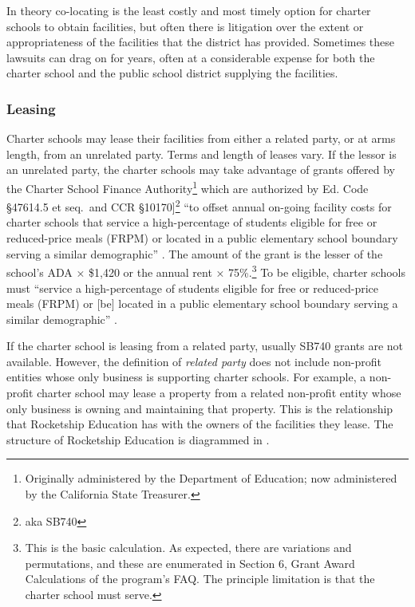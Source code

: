 In theory co-locating is the least costly and most timely option for charter schools to obtain facilities, but often there is litigation over the extent or appropriateness of the facilities that the district has provided. Sometimes these lawsuits can drag on for years, often at a considerable expense for both the charter school and the public school district supplying the facilities.

\subsubsection{Leasing}\label{sec:leasing}\indent

Charter schools may lease their facilities from either a related party, or at arms length, from an unrelated party. Terms and length of leases vary. If the lessor is an unrelated party, the charter schools may take advantage of grants offered by the Charter School Finance Authority\footnote{Originally administered by the Department of Education; now administered by the California State Treasurer.} which are authorized by Ed. Code §47614.5 et seq. and CCR §10170]\footnote{aka SB740} ``to offset annual on-going facility costs for charter schools that service a high-percentage of students eligible for free or reduced-price meals (FRPM) or located in a public elementary school boundary serving a similar demographic'' \parencite{CATreasurer2023}. The amount of the grant is the lesser of the school's ADA × \$1,420 or the annual rent × 75\%.\footnote{This is the basic calculation. As expected, there are variations and permutations, and these are enumerated in Section 6, Grant Award Calculations of the program's FAQ\@. The principle limitation is that the charter school must serve.} To be eligible, charter schools must ``service a high-percentage of students eligible for free or reduced-price meals (FRPM) or [be] located in a public elementary school boundary serving a similar demographic'' \parencite{CATreasurer2023}.

If the charter school is leasing from a related party, usually SB740 grants are not available. However, the definition of \emph{related party} does not include non-profit entities whose only business is supporting charter schools. For example, a non-profit charter school may lease a property from a related non-profit entity whose only business is owning and maintaining that property. This is the relationship that Rocketship Education has with the owners of the facilities they lease. The structure of Rocketship Education is diagrammed in .

